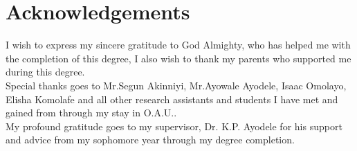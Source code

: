 \chapter*{ \textbf{\Large \sc Acknowledgements}}
\vspace{50pt}

I wish to express my sincere gratitude to God Almighty, who has helped me with the completion of this degree,  I also wish to thank my parents who supported me during this degree.\\
Special thanks goes to Mr.Segun Akinniyi, Mr.Ayowale Ayodele, Isaac Omolayo, Elisha Komolafe and all other research assistants and students I have met and gained from through my stay in O.A.U..\\
My profound gratitude goes to my supervisor, Dr. K.P. Ayodele for his support and advice from my sophomore year through my degree completion.
